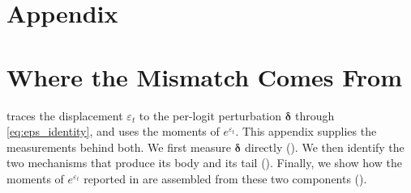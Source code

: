 \appendix


\clearpage
\section*{Appendix}

\startcontents[appendix]

\vspace{1em}
\section{Where the Mismatch Comes From}
\label{app:mismatch}

 traces the displacement $\varepsilon_t$ to the
per-logit perturbation $\boldsymbol\delta$ through \eqref{eq:eps_identity}, and
 uses the moments of $e^{\varepsilon_t}$. This
appendix supplies the measurements behind both. We first measure
$\boldsymbol\delta$ directly (). We then identify the two
mechanisms that produce its body and its tail ().
Finally, we show how the moments of $e^{\varepsilon_t}$ reported in
 are assembled from these two components ().

